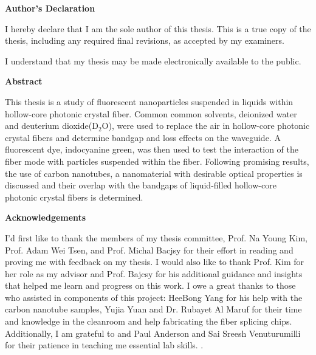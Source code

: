 \cleardoublepage %

 \begin{center}\textbf{Author's Declaration}\end{center}
  
 \noindent
I hereby declare that I am the sole author of this thesis. This is a true copy of the thesis, including any required final revisions, as accepted by my examiners.

  \bigskip
  
  \noindent
I understand that my thesis may be made electronically available to the public.

\cleardoublepage


\begin{center}\textbf{Abstract}\end{center}
This thesis is a study of fluorescent nanoparticles suspended in liquids within hollow-core photonic crystal fiber. Common  common solvents, deionized water and deuterium dioxide(D${}_2$O), were used to replace the air in hollow-core photonic crystal fibers and determine bandgap and loss effects on the waveguide. A fluorescent dye, indocyanine green, was then used to test the interaction of the fiber mode with particles suspended within the fiber. Following promising results, the use of carbon nanotubes, a nanomaterial with desirable optical properties is discussed and their overlap with the bandgaps of liquid-filled hollow-core photonic crystal fibers is determined. 

\cleardoublepage


\begin{center}\textbf{Acknowledgements}\end{center}
I'd first like to thank the members of my thesis committee, Prof. Na Young Kim, Prof. Adam Wei Tsen, and Prof. Michal Bacjsy for their effort in reading and proving me with feedback on my thesis. I would also like to thank Prof. Kim for her role as my advisor and Prof. Bajcsy for his additional guidance and insights that helped me learn and progress on this work. I owe a great thanks to those who assisted in components of this project: HeeBong Yang for his help with the carbon nanotube samples, Yujia Yuan and Dr. Rubayet Al Maruf for their time and knowledge in the cleanroom and help fabricating the fiber splicing chips. Additionally, I am grateful to and Paul Anderson and Sai Sreesh Venuturumilli for their patience in teaching me essential lab skills.
.
\cleardoublepage

